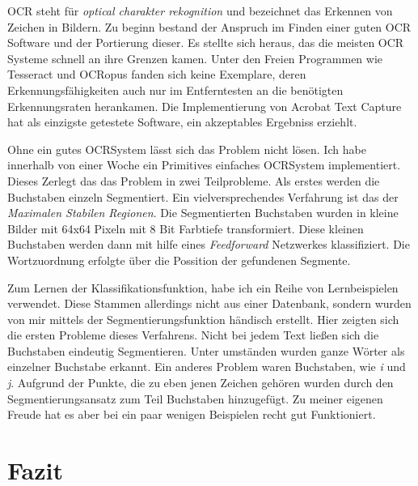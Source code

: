 \documentclass[12pt]{article}
\begin{document}
OCR steht für \textit{optical charakter rekognition} und bezeichnet das Erkennen von Zeichen in Bildern.
Zu beginn bestand der Anspruch im Finden einer guten OCR Software und der Portierung dieser.
Es stellte sich heraus, das die meisten OCR Systeme schnell an ihre Grenzen kamen. 
Unter den Freien Programmen wie Tesseract und OCRopus fanden sich keine Exemplare, deren Erkennungsfähigkeiten
auch nur im Entferntesten an die benötigten Erkennungsraten herankamen.
Die Implementierung von Acrobat Text Capture hat als einzigste getestete Software, ein akzeptables Ergebniss erziehlt.

Ohne ein gutes OCRSystem lässt sich das Problem nicht lösen. Ich habe innerhalb von einer Woche ein Primitives
einfaches OCRSystem implementiert. Dieses Zerlegt das das Problem in zwei Teilprobleme. Als erstes werden die Buchstaben
einzeln Segmentiert. Ein vielversprechendes Verfahrung ist das der \textit{Maximalen Stabilen Regionen}. 
Die Segmentierten Buchstaben wurden in kleine Bilder mit 64x64 Pixeln mit 8 Bit Farbtiefe transformiert.
Diese kleinen Buchstaben werden dann mit hilfe eines \textit{Feedforward} Netzwerkes klassifiziert.
Die Wortzuordnung erfolgte über die Possition der gefundenen Segmente.

Zum Lernen der Klassifikationsfunktion, habe ich ein Reihe von Lernbeispielen verwendet. Diese Stammen allerdings nicht
aus einer Datenbank, sondern wurden von mir mittels der Segmentierungsfunktion händisch erstellt. Hier zeigten sich
die ersten Probleme dieses Verfahrens. Nicht bei jedem Text ließen sich die Buchstaben eindeutig Segmentieren. Unter
umständen wurden ganze Wörter als einzelner Buchstabe erkannt. Ein anderes Problem waren Buchstaben, wie \textit{i}
und \textit{j}. Aufgrund der Punkte, die zu eben jenen Zeichen gehören wurden durch den Segmentierungsansatz zum Teil Buchstaben
hinzugefügt. Zu meiner eigenen Freude hat es aber bei ein paar wenigen Beispielen recht gut Funktioniert.

\section{Fazit}
\end{document}

